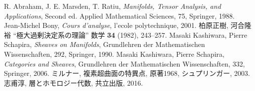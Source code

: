 \begin{thebibliography}{20} 
     R. Abraham, J. E. Marsden, T. Ratiu,
        \textit{Manifolds, Tensor Analysis, and Applications}, 
        Second ed. Applied Mathematical Sciences, 75, Springer, 1988.
     Jean-Michel Bony, 
        \textit{Cours d'analyse}, 
        l'ecole polytechnique, 2001.
    柏原正樹, 河合隆裕 ``極大過剰決定系の理論'' 
        数学 \textbf{34} (1982), 243--257.
     Masaki Kashiwara, Pierre Schapira, 
        \textit{Sheaves on Manifolds}, 
        Grundlehren der Mathematischen Wissenschaften, 292, Springer, 1990.
     Masaki Kashiwara, Pierre Schapira, 
        \textit{Categories and Sheaves}, 
        Grundlehren der Mathematischen Wissenschaften, 332, Springer, 2006.
     ミルナー, 複素超曲面の特異点, 原著1968, シュプリンガー, 2003.
     志甫淳, 層とホモロジー代数, 共立出版, 2016.
\end{thebibliography}




